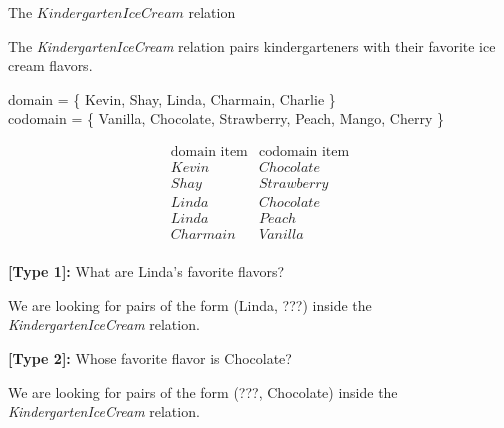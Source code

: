 \documentclass{ximera}
\begin{document}
\begin{example} The $KindergartenIceCream$ relation

The \textit{KindergartenIceCream} relation pairs kindergarteners with their favorite ice cream flavors.

domain = \{ Kevin, Shay, Linda, Charmain, Charlie \}  \\
codomain = \{ Vanilla, Chocolate, Strawberry, Peach, Mango, Cherry \} 

\[
\begin{array}{l|l}
    \text{domain item}      & \text{codomain item}      \\ \hline
    Kevin   &  Chocolate \\
    Shay   & Strawberry \\
    Linda  &  Chocolate \\
    Linda  &  Peach \\
    Charmain &  Vanilla \\ 
\end{array}
\]


\begin{question}

\textbf{[Type 1]:} What are Linda's favorite flavors? 

\begin{selectAll}
\end{selectAll}
\end{question}

We are looking for pairs of the form (Linda, ???) inside the \textit{KindergartenIceCream} relation.




\newpage

\begin{question}

\textbf{[Type 2]:} Whose favorite flavor is Chocolate? 

\begin{selectAll}

\end{selectAll}
\end{question}

We are looking for pairs of the form (???, Chocolate) inside the \textit{KindergartenIceCream} relation.



\end{example} 
\end{document}
